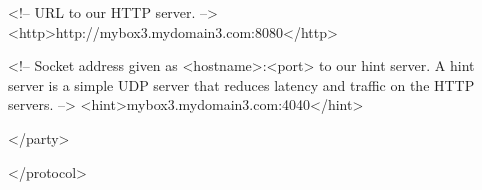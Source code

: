       <!-- URL to our HTTP server. -->
      <http>http://mybox3.mydomain3.com:8080</http>

      <!-- Socket address given as <hostname>:<port> to our hint server. 
           A hint server is a simple UDP server that reduces latency and 
           traffic on the HTTP servers. -->
      <hint>mybox3.mydomain3.com:4040</hint>

   </party>

</protocol>

